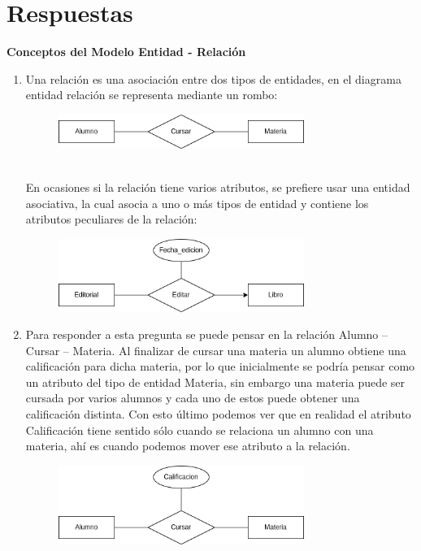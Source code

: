 \documentclass{exam}
\begin{document}
\section*{Respuestas}
\begin{questions}
	\question \textbf{Conceptos del Modelo Entidad - Relación}
	\begin{enumerate}[label=\alph*.]
		\item Una relación es una asociación entre dos tipos de entidades, en el diagrama entidad relación se representa mediante un rombo:
		\begin{figure}[h!]
	        \centering
	        \includegraphics[width=8cm]{imgNolasco/1.png}
	    \end{figure}
		\\En ocasiones si la relación tiene varios atributos, se prefiere usar una entidad asociativa, la cual asocia a uno o más tipos de entidad y contiene los atributos peculiares de la relación:
		\begin{figure}[h!]
	        \centering
	        \includegraphics[width=8cm]{imgNolasco/2.png}
	    \end{figure}
	    
		\item Para responder a esta pregunta se puede pensar en la relación Alumno -- Cursar -- Materia. Al finalizar de cursar una materia un alumno obtiene una calificación para dicha materia, por lo que inicialmente se podría pensar como un atributo del tipo de entidad Materia, sin embargo una materia puede ser cursada por varios alumnos y cada uno de estos puede obtener una calificación distinta. Con esto último podemos ver que en realidad el atributo Calificación tiene sentido sólo cuando se relaciona un alumno con una materia, ahí es cuando podemos mover ese atributo a la relación.
		\begin{figure}[h!]
	        \centering
	        \includegraphics[width=8cm]{imgNolasco/3.png}
	    \end{figure}
	    

\end{enumerate}
\end{questions}
\end{document}

